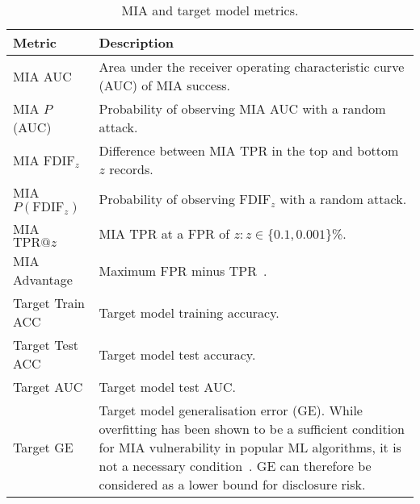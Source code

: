 \begin{table}[t]
    \caption{MIA and target model metrics.}%
    \label{table:metrics}
    \small
    \centering
    \begin{tabularx}{\textwidth}{lX}
        \toprule
        {\bf Metric} & {\bf Description} \\
        \midrule
        MIA AUC & Area under the receiver operating characteristic curve (AUC) of MIA success. \\
        MIA $P$(AUC) & Probability of observing MIA AUC with a random attack.\\
        MIA $\text{FDIF}_z$ & Difference between MIA TPR in the top and bottom $z$ records. \\
        MIA $P(\text{FDIF}_z)$ & Probability of observing $\text{FDIF}_z$ with a random attack.\\
        MIA $\text{TPR@}z$ & MIA TPR at a FPR of $z: z\in\{0.1, 0.001\}$\%. \\
        MIA Advantage & Maximum FPR minus TPR~\cite{Yeom:2018}. \\
        Target Train ACC & Target model training accuracy. \\
        Target Test ACC & Target model test accuracy. \\
        Target AUC & Target model test AUC\@. \\
        Target GE & Target model generalisation error (GE). While overfitting has been shown to be a sufficient condition for MIA vulnerability in popular ML algorithms, it is not a necessary condition~\cite{Yeom:2018}. GE can therefore be considered as a lower bound for disclosure risk. \\
        \bottomrule
    \end{tabularx}
\end{table}

